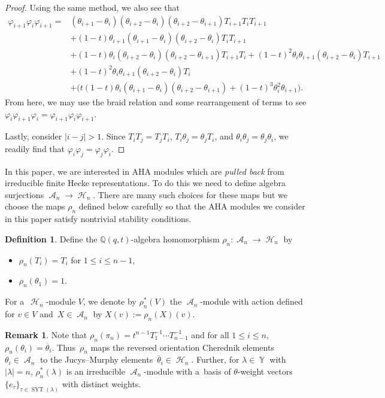 \documentclass[10pt,a4paper]{amsart}
\numberwithin{equation}{section}
\theoremstyle{definition}
\newtheorem{Definition}[Theorem]{Definition}
\newtheorem{Remark}[Theorem]{Remark}
\DeclareMathOperator{\Par}{\mathbb{Y}}
\DeclareMathOperator{\SYT}{\mathrm{SYT}}
\DeclareMathOperator{\sH}{\mathscr{H}}
\DeclareMathOperator{\sA}{\mathscr{A}}
\begin{document}
\begin{proof}
Using the same method, we also see that
\begin{align*}
 \varphi_{i+1}\varphi_{i}\varphi_{i+1}= {}&(\theta_{i+1}-\theta_i)(\theta_{i+2}-\theta_i)(\theta_{i+2}-\theta_{i+1})T_{i+1}T_iT_{i+1} \\
&+ (1-t)\theta_{i+1}(\theta_{i+1}-\theta_i)(\theta_{i+2}-\theta_{i})T_iT_{i+1} \\
& + (1-t)\theta_i (\theta_{i+2}-\theta_{i})(\theta_{i+2}-\theta_{i+1})T_{i+1}T_i + (1-t)^2 \theta_{i}\theta_{i+1}(\theta_{i+2}-\theta_i)T_{i+1} \\
& + (1-t)^2 \theta_{i}\theta_{i+1}(\theta_{i+2}-\theta_i)T_{i} \\
& + \bigl( t(1-t)\theta_i(\theta_{i+1}-\theta_i)(\theta_{i+2}-\theta_{i+1}) + (1-t)^3 \theta_{i}^2 \theta_{i+1} \bigr).
\end{align*}
From here, we may use the braid relation  and some rearrangement of terms to see $\varphi_i\varphi_{i+1}\varphi_i = \varphi_{i+1}\varphi_{i}\varphi_{i+1}$.

Lastly, consider $|i - j| >1$. Since $T_iT_j = T_jT_i$, $T_i\theta_j = \theta_j T_i$, and $\theta_i\theta_j= \theta_j \theta_i$, we readily find that $\varphi_i\varphi_j = \varphi_j\varphi_i$.
\end{proof}

In this paper, we are interested in AHA modules which are \textit{pulled back} from irreducible finite Hecke representations. To do this we need to define algebra surjections $\sA_n \rightarrow \sH_n$. There are many such choices for these maps but we choose the maps $\rho_n$ defined below carefully so that the AHA modules we consider in this paper satisfy nontrivial stability conditions.

\begin{Definition}\label{map from affine to finite hecke}
 Define the $\mathbb{Q}(q,t)$-algebra homomorphism $\rho_n\colon\sA_n \rightarrow \sH_n$ by
 \begin{itemize}
\itemsep=0pt
 \item $\rho_n(T_i) = T_i$ for $1\leq i \leq n-1$,
 \item $\rho_n(\theta_1) = 1$.
 \end{itemize}
 For a~$\sH_n$-module $V$, we denote by $\rho_n^{*}(V)$ the $\sA_n$-module with action defined for $v \in V$ and~${X \in \sA_n}$ by $X(v) := \rho_n(X)(v)$.
\end{Definition}

\begin{Remark}
 Note that $\rho_n(\pi_n) = t^{n-1}T_1^{-1}\cdots T_{n-1}^{-1}$ and for all $1\leq i \leq n$, $\rho_n(\theta_i) = \overline{\theta}_i$. Thus~$\rho_n$ maps the reversed orientation Cherednik elements $\theta_i \in \sA_n$ to the Jucys--Murphy elements~${\overline{\theta}_i \in \sH_n}$. Further, for $\lambda \in \Par$ with $|\lambda| = n$, $\rho_n^{*}(\lambda)$ is an irreducible $\sA_n$-module with a~basis of $\theta$-weight vectors $\{e_{\tau}\}_{\tau \in \SYT(\lambda)}$ with distinct weights.
\end{Remark}
\end{document}
